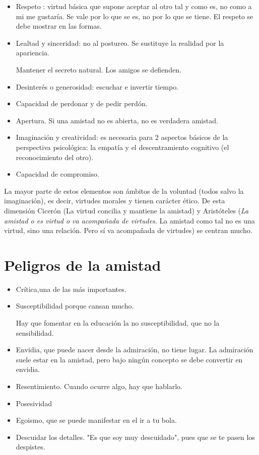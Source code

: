 \documentclass[palatino]{apuntesURJC}
\begin{document}
\begin{itemize}
	\item Respeto : virtud básica que supone aceptar al otro tal y como es, no como a mi me gustaría.
	Se vale por lo que se es, no por lo que se tiene.
	\subitem El respeto se debe mostrar en las formas.


	\item Lealtad y sinceridad: no al postureo. Se sustituye la realidad por la apariencia.
	
	\subitem Mantener el secreto natural.
	\subitem Los amigos se defienden.
	
	\item Desinterés o generosidad: escuchar e invertir tiempo.

	\item Capacidad de perdonar y de pedir perdón.

	\item Apertura.
	\subitem Si una amistad no es abierta, no es verdadera amistad.

	\item Imaginación y creatividad: es necesaria para 2 aspectos básicos de la perspectiva psicológica: 
	la empatía y el descentramiento cognitivo (el reconocimiento del otro).

	\item Capacidad de compromiso.

\end{itemize}

La mayor parte de estos elementos son ámbitos de la voluntad (todos salvo la imaginación), es decir, virtudes morales y tienen carácter ético.
%
De esta dimensión Cicerón (La virtud concilia y mantiene la amistad) y Aristóteles (\textit{La amistad o es virtud o va acompañada de virtudes}. La amistad como tal no es una virtud, sino una relación. Pero sí va acompañada de virtudes) se centran mucho.

\section{Peligros de la amistad}

\begin{itemize}
\item Crítica,una de las más importantes.
\item Susceptibilidad porque cansan mucho.

\subitem Hay que fomentar en la educación la no susceptibilidad, que no la sensibilidad.

\item Envidia, que puede nacer desde la admiración, no tiene lugar.
%
\subitem La admiración suele estar en la amistad, pero bajo ningún concepto se debe convertir en envidia.
%
\item Resentimiento. Cuando ocurre algo, hay que hablarlo.
%
\item Posesividad
\item Egoismo, que se puede manifestar en el ir a tu bola.
\item Descuidar los detalles. "Es que soy muy descuidado", pues que se te pasen los despistes.
\end{itemize}
\end{document}
